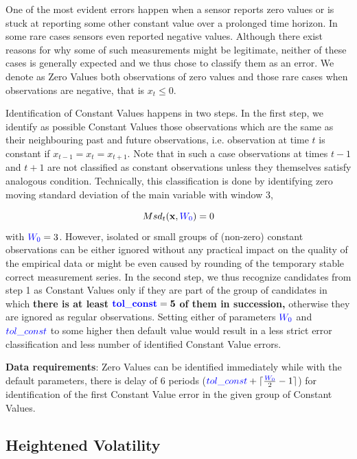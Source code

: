 \documentclass[12pt,a4paper]{article}
\begin{document}
One of the most evident errors happen when a sensor reports zero values or is stuck at reporting some other constant value over a prolonged time horizon. In some rare cases sensors even reported negative values. Although there exist reasons for why some of such measurements might be legitimate, neither of these cases is generally expected and we thus chose to classify them as an error. 
We denote as Zero Values both  observations of zero values and those rare cases when observations are negative, that is $x_t \leq 0$. 

Identification of Constant Values happens in two steps. In the first step, we identify as possible Constant Values  those observations which are the same as their neighbouring past and future observations, i.e. observation at time $t$ is constant if $x_{t-1} = x_t = x_{t+1}$. Note that in such a case observations at times $t-1$ and $t+1$ are not classified as constant observations unless they themselves satisfy analogous condition. Technically, this classification is done by identifying zero moving standard deviation of the main variable  with window 3,

$$ Msd_t(\mathbf{x},\textcolor{blue}{W_0} ) = 0 $$
with $\textcolor{blue}{W_0}  = 3$. However, isolated or small groups of (non-zero) constant observations  can be either ignored without any practical impact on the quality of the empirical data or might be even caused by rounding of the temporary stable correct measurement series. In the second step, we thus recognize candidates from step 1 as Constant Values only if they are part of the group of candidates in which \textbf{there is at least} $\mathbf{\textcolor{blue}{tol\_const}  = 5}$ \textbf{of them in succession,} otherwise they are ignored as regular observations.  Setting either of parameters $\textcolor{blue}{W_0} $ and $\textcolor{blue}{tol\_const} $   to some higher then default value would result in a less strict error classification and less number of  identified Constant Value errors.  

\textbf{Data requirements}: Zero Values can be identified immediately while with the default parameters, there is delay of  6 periods ($\textcolor{blue}{tol\_const}+\lceil \frac{\textcolor{blue}{W_0}}{2}-1 \rceil$) for identification of the first Constant Value error in the given group of Constant Values.




\subsection{Heightened Volatility}
\end{document}
